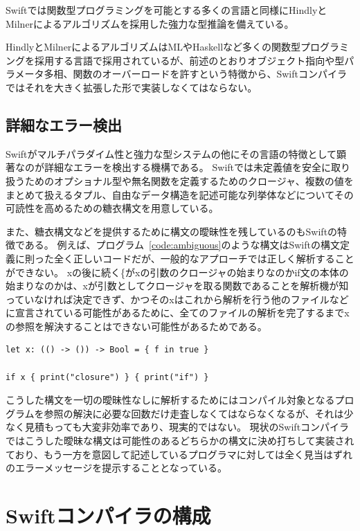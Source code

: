 Swiftでは関数型プログラミングを可能とする多くの言語と同様にHindlyとMilnerによるアルゴリズムを採用した強力な型推論を備えている。

HindlyとMilnerによるアルゴリズムはMLやHaskellなど多くの関数型プログラミングを採用する言語で採用されているが、前述のとおりオブジェクト指向や型パラメータ多相、関数のオーバーロードを許すという特徴から、Swiftコンパイラではそれを大きく拡張した形で実装しなくてはならない。


\subsection{詳細なエラー検出}
\label{explain-swift:features:readability}

Swiftがマルチパラダイム性と強力な型システムの他にその言語の特徴として顕著なのが詳細なエラーを検出する機構である。
Swiftでは未定義値を安全に取り扱うためのオプショナル型や無名関数を定義するためのクロージャ、複数の値をまとめて扱えるタプル、自由なデータ構造を記述可能な列挙体などについてその可読性を高めるための糖衣構文を用意している。

また、糖衣構文などを提供するために構文の曖昧性を残しているのもSwiftの特徴である。
例えば、プログラム~\ref{code:ambiguous}のような構文はSwiftの構文定義に則った全く正しいコードだが、一般的なアプローチでは正しく解析することができない。
xの後に続く\{がxの引数のクロージャの始まりなのかif文の本体の始まりなのかは、xが引数としてクロージャを取る関数であることを解析機が知っていなければ決定できず、かつそのxはこれから解析を行う他のファイルなどに宣言されている可能性があるために、全てのファイルの解析を完了するまでxの参照を解決することはできない可能性があるためである。

\begin{lstlisting}[caption=曖昧な構文を持った正しいSwiftコード, label=code:ambiguous]
let x: (() -> ()) -> Bool = { f in true }

if x { print("closure") } { print("if") }
\end{lstlisting}

こうした構文を一切の曖昧性なしに解析するためにはコンパイル対象となるプログラムを参照の解決に必要な回数だけ走査しなくてはならなくなるが、それは少なく見積もっても大変非効率であり、現実的ではない。
現状のSwiftコンパイラではこうした曖昧な構文は可能性のあるどちらかの構文に決め打ちして実装されており、もう一方を意図して記述しているプログラマに対しては全く見当はずれのエラーメッセージを提示することとなっている。


\section{Swiftコンパイラの構成}
\label{explain-swift:structure}

